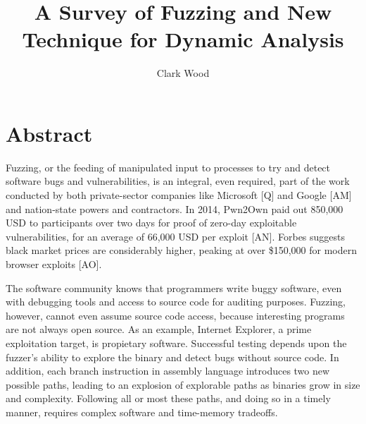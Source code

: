 \documentclass[11pt,expanded,copyright]{fsuthesis}
\title{A Survey of Fuzzing and New Technique for Dynamic Analysis}
\author{Clark Wood}
\begin{document}
\frontmatter
\maketitle
\makecommitteepage



\tableofcontents




\mainmatter

%

\chapter{Abstract}

Fuzzing, or the feeding of manipulated input to processes to try and detect software bugs and vulnerabilities, is an integral, even required, part of the work conducted by both private-sector companies like Microsoft [Q] and Google [AM] and nation-state powers and contractors. In 2014, Pwn2Own paid out 850,000 USD to participants over two days for proof of zero-day exploitable vulnerabilities, for an average of 66,000 USD per exploit [AN]. Forbes suggests black market prices are considerably higher, peaking at over \$150,000 for modern browser exploits [AO].

The software community knows that programmers write buggy software, even with debugging tools and access to source code for auditing purposes. Fuzzing, however, cannot even assume source code access, because interesting programs are not always open source. As an example, Internet Explorer, a prime exploitation target, is propietary software. Successful testing depends upon the fuzzer's ability to explore the binary and detect bugs without source code. In addition, each branch instruction in assembly language introduces two new possible paths, leading to an explosion of explorable paths as binaries grow in size and complexity. Following all or most these paths, and doing so in a timely manner, requires complex software and time-memory tradeoffs.
\end{document}
